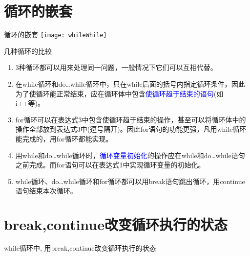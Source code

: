 \section{循环的嵌套}

\begin{frame}{循环的嵌套}
\centering
\texttt{[image: whileWhile]}
\end{frame}

\begin{frame}{几种循环的比较}
\begin{enumerate}
	\item 3种循环都可以用来处理同一问题，一般情况下它们可以互相代替。
	\item 在while循环和do…while循环中，只在while后面的括号内指定循环条件，因此为了使循环能正常结束，应在循环体中包含\textcolor{blue}{使循环趋于结束的语句}(如i++等)。
	\item for循环可以在表达式3中包含使循环趋于结束的操作，甚至可以将循环体中的操作全部放到表达式3中(逗号隔开)。因此for语句的功能更强，凡用while循环能完成的，用for循环都能实现。
	\item 用while和do…while循环时，\textcolor{blue}{循环变量初始化}的操作应在while和do…while语句之前完成。而for语句可以在表达式1中实现循环变量的初始化。
	\item while循环、do…while循环和for循环都可以用break语句跳出循环，用continue语句结束本次循环。	
\end{enumerate}
\end{frame}

\section{break,continue改变循环执行的状态}

\begin{frame}{while循环中, 用break,continue改变循环执行的状态}
\vspace{-0.2cm}
\centering
{}
\end{frame}

